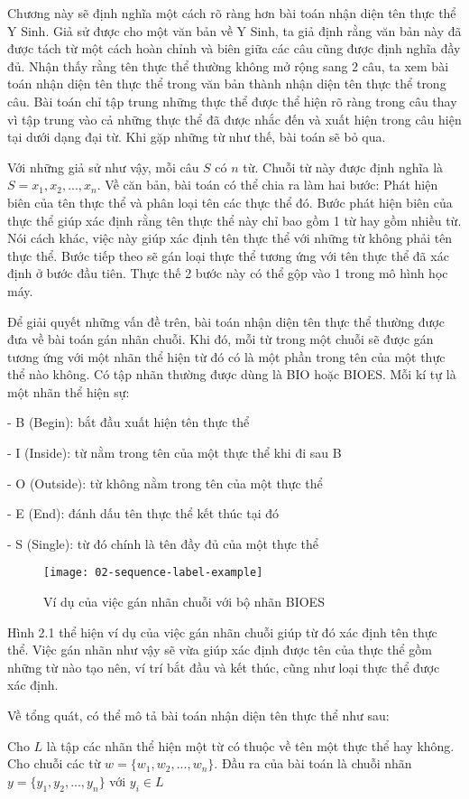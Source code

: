 \documentclass[../main.tex]{subfiles}
\begin{document}
Chương này sẽ định nghĩa một cách rõ ràng hơn bài toán nhận diện tên thực thể Y Sinh. Giả sử được cho một văn bản về Y Sinh, ta giả định rằng văn bản này đã được tách từ một cách hoàn chỉnh và biên giữa các câu cũng được định nghĩa đầy đủ. Nhận thấy rằng tên thực thể thường không mở rộng sang 2 câu, ta xem bài toán nhận diện tên thực thể trong văn bản thành nhận diện tên thực thể trong câu. Bài toán chỉ tập trung những thực thể được thể hiện rõ ràng trong câu thay vì tập trung vào cả những thực thể đã được nhắc đến và xuất hiện trong câu hiện tại dưới dạng đại từ. Khi gặp những từ như thế, bài toán sẽ bỏ qua.

Với những giả sử như vậy, mỗi câu $S$ có $n$ từ. Chuỗi từ này được định nghĩa là $S  = {x_{1}, x_{2}, ..., x_{n}}$. Về căn bản, bài toán có thể chia ra làm hai bước: Phát hiện biên của tên thực thể và phân loại tên các thực thể đó. Bước phát hiện biên của thực thể giúp xác định rằng tên thực thể này chỉ bao gồm 1 từ hay gồm nhiều từ. Nói cách khác, việc này giúp xác định tên thực thể với những từ không phải tên thực thể. Bước tiếp theo sẽ gán loại thực thể tương ứng với tên thực thể đã xác định ở bước đầu tiên. Thực thế 2 bước này có thể gộp vào 1 trong mô hình học máy. 

Để giải quyết những vấn đề trên, bài toán nhận diện tên thực thể thường được đưa về bài toán gán nhãn chuỗi. Khi đó, mỗi từ trong một chuỗi sẽ được gán tương ứng với một nhãn thể hiện từ đó có là một phần trong tên của một thực thể nào không.  
Có tập nhãn thường được dùng là BIO hoặc BIOES. Mỗi kí tự là một nhãn thể hiện sự:

- B (Begin):  bắt đầu xuất hiện tên thực thể

- I (Inside): từ nằm trong tên của một thực thể khi đi sau B 

- O (Outside): từ không nằm trong tên của một thực thể

- E (End): đánh dấu tên thực thể kết thúc tại đó

- S (Single): từ đó chính là tên đầy đủ của một thực thể

\begin{figure}[h]
\centering
\texttt{[image: 02-sequence-label-example]}
\caption{Ví dụ của việc gán nhãn chuỗi với bộ nhãn BIOES}
\end{figure}

Hình 2.1 thể hiện ví dụ của việc gán nhãn chuỗi giúp từ đó xác định tên thực thể. Việc gán nhãn như vậy sẽ vừa giúp xác định được tên của thực thể gồm những từ nào tạo nên, ví trí bắt đầu và kết thúc, cũng như loại thực thể được xác định.

Về tổng quát, có thể mô tả bài toán nhận diện tên thực thể như sau:

Cho $L$ là tập các nhãn thể hiện một từ có thuộc về tên một thực thể hay không. Cho chuỗi các từ $w = \{w_{1}, w_{2}, ..., w_{n}\}$. Đầu ra của bài toán là chuỗi nhãn $y = \{y_{1}, y_{2}, ..., y_{n}\}$ với $y_{i} \in L$
\end{document}
